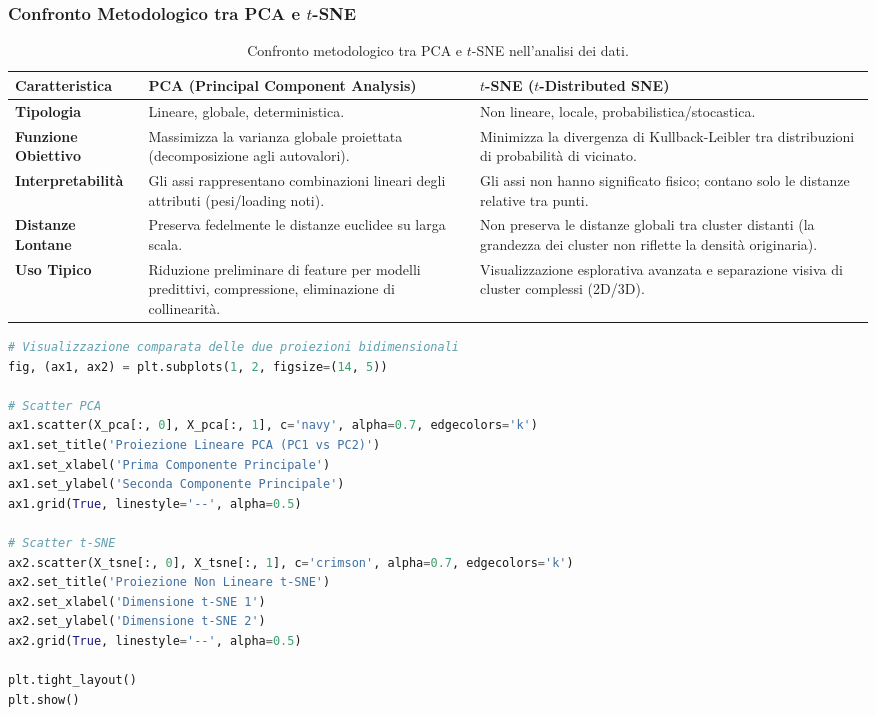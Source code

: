 \FloatBarrier
\subsubsection{Confronto Metodologico tra PCA e $t$-SNE}

\begin{table}[H]
    \centering
    \small
    \begin{tabularx}{\textwidth}{lXX}
        \toprule
        \textbf{Caratteristica} & \textbf{PCA (Principal Component Analysis)} & \textbf{$t$-SNE ($t$-Distributed SNE)} \\
        \midrule
        \textbf{Tipologia} & Lineare, globale, deterministica. & Non lineare, locale, probabilistica/stocastica. \\
        \addlinespace
        \textbf{Funzione Obiettivo} & Massimizza la varianza globale proiettata (decomposizione agli autovalori). & Minimizza la divergenza di Kullback-Leibler tra distribuzioni di probabilità di vicinato. \\
        \addlinespace
        \textbf{Interpretabilità} & Gli assi rappresentano combinazioni lineari degli attributi (pesi/loading noti). & Gli assi non hanno significato fisico; contano solo le distanze relative tra punti. \\
        \addlinespace
        \textbf{Distanze Lontane} & Preserva fedelmente le distanze euclidee su larga scala. & Non preserva le distanze globali tra cluster distanti (la grandezza dei cluster non riflette la densità originaria). \\
        \addlinespace
        \textbf{Uso Tipico} & Riduzione preliminare di feature per modelli predittivi, compressione, eliminazione di collinearità. & Visualizzazione esplorativa avanzata e separazione visiva di cluster complessi (2D/3D). \\
        \bottomrule
    \end{tabularx}
    \caption{Confronto metodologico tra PCA e $t$-SNE nell'analisi dei dati.}
    \label{tab:dm-pca-vs-tsne}
\end{table}

\begin{lstlisting}[language=Python, style=code]
# Visualizzazione comparata delle due proiezioni bidimensionali
fig, (ax1, ax2) = plt.subplots(1, 2, figsize=(14, 5))

# Scatter PCA
ax1.scatter(X_pca[:, 0], X_pca[:, 1], c='navy', alpha=0.7, edgecolors='k')
ax1.set_title('Proiezione Lineare PCA (PC1 vs PC2)')
ax1.set_xlabel('Prima Componente Principale')
ax1.set_ylabel('Seconda Componente Principale')
ax1.grid(True, linestyle='--', alpha=0.5)

# Scatter t-SNE
ax2.scatter(X_tsne[:, 0], X_tsne[:, 1], c='crimson', alpha=0.7, edgecolors='k')
ax2.set_title('Proiezione Non Lineare t-SNE')
ax2.set_xlabel('Dimensione t-SNE 1')
ax2.set_ylabel('Dimensione t-SNE 2')
ax2.grid(True, linestyle='--', alpha=0.5)

plt.tight_layout()
plt.show()
\end{lstlisting}

